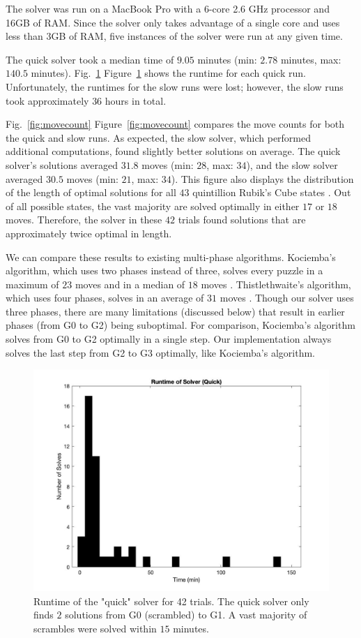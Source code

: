 \documentclass{article}
\newcommand{\fref}[2][]{%
  \ifthenelse{\equal{#1}{}}%
	{Fig.~\ref{fig:#2}}%
	{Figure~\ref{fig:#2}}}
\begin{document}
The solver was run on a MacBook Pro with a 6-core 2.6 GHz processor and 16GB of RAM. Since the solver only takes advantage of a single core and uses less than $3$GB of RAM, five instances of the solver were run at any given time.

The quick solver took a median time of $9.05$ minutes (min: $2.78$ minutes, max: $140.5$ minutes). \fref{runtime} shows the runtime for each quick run. Unfortunately, the runtimes for the slow runs were lost; however, the slow runs took approximately $36$ hours in total.

\fref{movecount} compares the move counts for both the quick and slow runs. As expected, the slow solver, which performed additional computations, found slightly better solutions on average. The quick solver's solutions averaged $31.8$ moves (min: $28$, max: $34$), and the slow solver averaged $30.5$ moves (min: $21$, max: $34$). This figure also displays the distribution of the length of optimal solutions for all $43$ quintillion Rubik's Cube states \cite{god}. Out of all possible states, the vast majority are solved optimally in either $17$ or $18$ moves. Therefore, the solver in these $42$ trials found solutions that are approximately twice optimal in length.

We can compare these results to existing multi-phase algorithms. Kociemba's algorithm, which uses two phases instead of three, solves every puzzle in a maximum of $23$ moves and in a median of $18$ moves \cite{kociemba-dist}. Thistlethwaite's algorithm, which uses four phases, solves in an average of $31$ moves \cite{thistle-dist}. Though our solver uses three phases, there are many limitations (discussed below) that result in earlier phases (from G0 to G2) being suboptimal. For comparison, Kociemba's algorithm solves from G0 to G2 optimally in a single step. Our implementation always solves the last step from G2 to G3 optimally, like Kociemba's algorithm.

\begin{figure}
	\centering
    \includegraphics[width=5.5in]{runtime.jpg}
	\caption{Runtime of the "quick" solver for 42 trials. The quick solver only finds $2$ solutions from G0 (scrambled) to G1. A vast majority of scrambles were solved within $15$ minutes.}
	\label{fig:runtime}
\end{figure}
\end{document}
